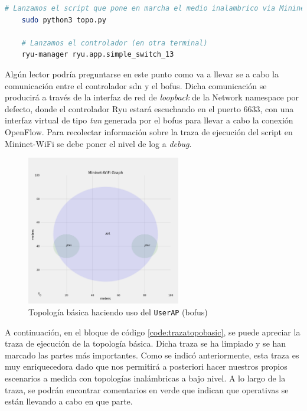 \begin{lstlisting}[language= bash, style=Consola, caption={Puesta en marcha del escenario básico},label=code:topoBasic]
    # Lanzamos el script que pone en marcha el medio inalambrico via Mininet-WiFi
    sudo python3 topo.py
   
    # Lanzamos el controlador (en otra terminal)
    ryu-manager ryu.app.simple_switch_13
\end{lstlisting}
\vspace{0.4cm}

Algún lector podría preguntarse en este punto como va a llevar se a cabo la comunicación entre el controlador \gls{sdn} y el \gls{bofus}. Dicha comunicación se producirá a través de la interfaz de red de \textit{loopback} de la Network namespace por defecto, donde el controlador Ryu estará escuchando en el puerto 6633, con una interfaz virtual de tipo \textit{tun} generada por el \gls{bofus} para llevar a cabo la conexión OpenFlow.  Para recolectar información sobre la traza de ejecución del script en Mininet-WiFi se debe poner el nivel de log a \textit{debug}.\\

\begin{figure}[ht!]
    \centering
    \includegraphics[width=0.6\textwidth]{archivos/img/analisis/topoBasic.png}
    \caption{Topología básica haciendo uso del \texttt{UserAP} (\gls{bofus})}
    \label{fig:topoBasic}
\end{figure}


A continuación, en el bloque de código \ref{code:trazatopobasic}, se puede apreciar la traza de ejecución de la topología básica. Dicha traza se ha limpiado y se han marcado las partes más importantes. Como se indicó anteriormente, esta traza es muy enriquecedora dado que nos permitirá a posteriori hacer nuestros propios escenarios a medida con topologías inalámbricas a bajo nivel. A lo largo de la traza, se podrán encontrar comentarios en verde que indican que operativas se están llevando a cabo en que parte.


